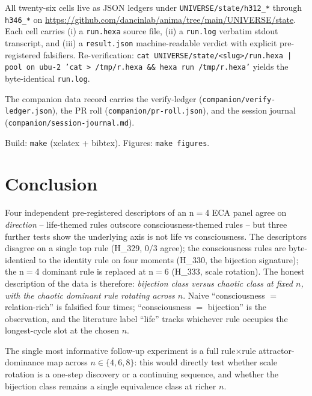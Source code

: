 \documentclass[11pt,a4paper]{article}
\begin{document}
All twenty-six cells live as JSON ledgers under
\texttt{UNIVERSE/state/h312\_*} through
\texttt{h346\_*} on
\url{https://github.com/dancinlab/anima/tree/main/UNIVERSE/state}.
Each cell carries (i) a \texttt{run.hexa} source file, (ii) a
\texttt{run.log} verbatim stdout transcript, and (iii) a
\texttt{result.json} machine-readable verdict with explicit
pre-registered falsifiers. Re-verification:
\texttt{cat UNIVERSE/state/<slug>/run.hexa | pool on ubu-2 'cat
> /tmp/r.hexa \&\& hexa run /tmp/r.hexa'}
yields the byte-identical \texttt{run.log}.

The companion data record carries the verify-ledger
(\texttt{companion/verify-ledger.json}), the PR roll
(\texttt{companion/pr-roll.json}), and the session journal
(\texttt{companion/session-journal.md}).

Build: \texttt{make} (xelatex + bibtex). Figures: \texttt{make figures}.

\section{Conclusion}
\label{sec:conclusion}

Four independent pre-registered descriptors of an n$=$4 ECA panel agree
on \emph{direction} -- life-themed rules outscore consciousness-themed
rules -- but three further tests show the underlying axis is not
life vs consciousness. The descriptors disagree on a single top rule
(H\_329, $0/3$ agree); the consciousness rules are byte-identical to
the identity rule on four moments (H\_330, the bijection signature);
the n$=$4 dominant rule is replaced at n$=$6 (H\_333, scale rotation).
The honest description of the data is therefore:
\emph{bijection class versus chaotic class at fixed $n$, with the
chaotic dominant rule rotating across $n$}. Naive
``consciousness $=$ relation-rich'' is falsified
four times; ``consciousness $=$ bijection'' is the
observation, and the literature label ``life'' tracks
whichever rule occupies the longest-cycle slot at the chosen $n$.

The single most informative follow-up experiment is a full
rule$\times$rule attractor-dominance map across $n \in \{4, 6, 8\}$:
this would directly test whether scale rotation is a one-step
discovery or a continuing sequence, and whether the bijection class
remains a single equivalence class at richer $n$.

\end{document}
